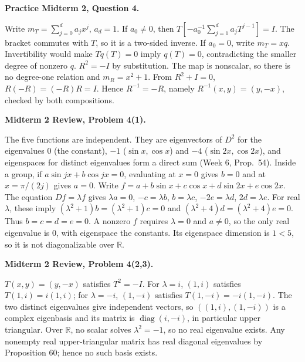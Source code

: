 \begin{prob}\textbf{Practice Midterm 2, Question 4.}\par
{}
\begin{steps}
\ii Write $m_T=\sum_{j=0}^d a_jx^j$, $a_d=1$. If $a_0\ne0$, then $T[-a_0^{-1}\sum_{j=1}^d a_jT^{j-1}]=I$. The bracket commutes with $T$, so it is a two-sided inverse.
\ii If $a_0=0$, write $m_T=xq$. Invertibility would make $Tq(T)=0$ imply $q(T)=0$, contradicting the smaller degree of nonzero $q$.
\ii $R^2=-I$ by substitution. The map is nonscalar, so there is no degree-one relation and $m_R=x^2+1$.
\ii From $R^2+I=0$, $R(-R)=(-R)R=I$. Hence $R^{-1}=-R$, namely $R^{-1}(x,y)=(y,-x)$, checked by both compositions.
\end{steps}\end{prob}
\begin{prob}\textbf{Midterm 2 Review, Problem 4(1).}\par
{}
\begin{steps}
\ii The five functions are independent. They are eigenvectors of $D^2$ for the eigenvalues $0$ (the constant), $-1$ ($\sin x,\cos x$) and $-4$ ($\sin2x,\cos2x$), and eigenspaces for distinct eigenvalues form a direct sum (Week 6, Prop.~54). Inside a group, if $a\sin jx+b\cos jx=0$, evaluating at $x=0$ gives $b=0$ and at $x=\pi/(2j)$ gives $a=0$.
\ii Write $f=a+b\sin x+c\cos x+d\sin2x+e\cos2x$. The equation $Df=\lambda f$ gives $\lambda a=0$, $-c=\lambda b$, $b=\lambda c$, $-2e=\lambda d$, $2d=\lambda e$.
\ii For real $\lambda$, these imply $(\lambda^2+1)b=(\lambda^2+1)c=0$ and $(\lambda^2+4)d=(\lambda^2+4)e=0$. Thus $b=c=d=e=0$. A nonzero $f$ requires $\lambda=0$ and $a\ne0$, so the only real eigenvalue is $0$, with eigenspace the constants.
\ii Its eigenspace dimension is $1<5$, so it is not diagonalizable over $\mathbb R$.
\end{steps}\end{prob}
\begin{prob}\textbf{Midterm 2 Review, Problem 4(2,3).}\par
{}
\begin{steps}
\ii $T(x,y)=(y,-x)$ satisfies $T^2=-I$. For $\lambda=i$, $(1,i)$ satisfies $T(1,i)=i(1,i)$; for $\lambda=-i$, $(1,-i)$ satisfies $T(1,-i)=-i(1,-i)$.
\ii The two distinct eigenvalues give independent vectors, so $((1,i),(1,-i))$ is a complex eigenbasis and its matrix is $\operatorname{diag}(i,-i)$, in particular upper triangular.
\ii Over $\mathbb R$, no scalar solves $\lambda^2=-1$, so no real eigenvalue exists. Any nonempty real upper-triangular matrix has real diagonal eigenvalues by Proposition 60; hence no such basis exists.
\end{steps}\end{prob}
